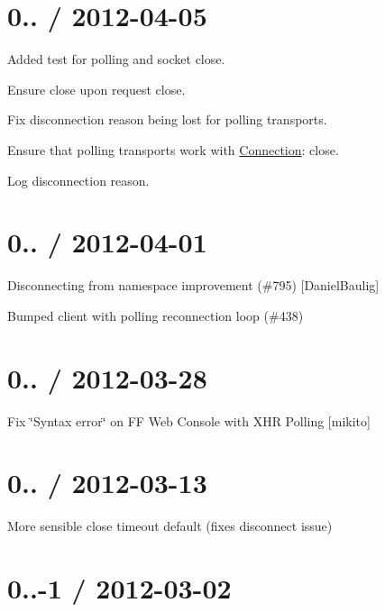 \section*{0.. / 2012-\/04-\/05 }


\begin{DoxyItemize}
\item Added test for polling and socket close.
\item Ensure close upon request close.
\item Fix disconnection reason being lost for polling transports.
\item Ensure that polling transports work with \mbox{\hyperlink{class_connection}{Connection}}\+: close.
\item Log disconnection reason.
\end{DoxyItemize}

\section*{0.. / 2012-\/04-\/01 }


\begin{DoxyItemize}
\item Disconnecting from namespace improvement (\#795) \mbox{[}Daniel\+Baulig\mbox{]}
\item Bumped client with polling reconnection loop (\#438)
\end{DoxyItemize}

\section*{0.. / 2012-\/03-\/28 }


\begin{DoxyItemize}
\item Fix \char`\"{}\+Syntax error\char`\"{} on FF Web Console with X\+HR Polling \mbox{[}mikito\mbox{]}
\end{DoxyItemize}

\section*{0.. / 2012-\/03-\/13 }


\begin{DoxyItemize}
\item More sensible close {\ttfamily timeout default} (fixes disconnect issue)
\end{DoxyItemize}

\section*{0..-\/1 / 2012-\/03-\/02 }


